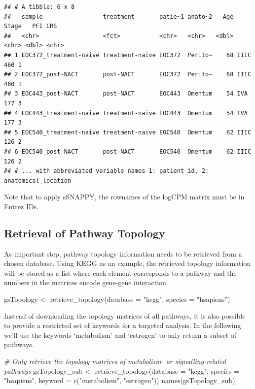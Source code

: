 \documentclass[9pt,a4paper,]{extarticle}
\newenvironment{Shaded}{\begin{snugshade}}{\end{snugshade}}
\newcommand{\AttributeTok}[1]{\textcolor[rgb]{0.77,0.63,0.00}{#1}}
\newcommand{\CommentTok}[1]{\textcolor[rgb]{0.56,0.35,0.01}{\textit{#1}}}
\newcommand{\FunctionTok}[1]{\textcolor[rgb]{0.00,0.00,0.00}{#1}}
\newcommand{\NormalTok}[1]{#1}
\newcommand{\OtherTok}[1]{\textcolor[rgb]{0.56,0.35,0.01}{#1}}
\newcommand{\StringTok}[1]{\textcolor[rgb]{0.31,0.60,0.02}{#1}}
\begin{document}
\begin{verbatim}
## # A tibble: 6 x 8
##   sample                 treatment       patie~1 anato~2   Age Stage   PFI CRS  
##   <chr>                  <fct>           <chr>   <chr>   <dbl> <chr> <dbl> <chr>
## 1 EOC372_treatment-naive treatment-naive EOC372  Perito~    68 IIIC    460 1    
## 2 EOC372_post-NACT       post-NACT       EOC372  Perito~    68 IIIC    460 1    
## 3 EOC443_post-NACT       post-NACT       EOC443  Omentum    54 IVA     177 3    
## 4 EOC443_treatment-naive treatment-naive EOC443  Omentum    54 IVA     177 3    
## 5 EOC540_treatment-naive treatment-naive EOC540  Omentum    62 IIIC    126 2    
## 6 EOC540_post-NACT       post-NACT       EOC540  Omentum    62 IIIC    126 2    
## # ... with abbreviated variable names 1: patient_id, 2: anatomical_location
\end{verbatim}

Note that to apply sSNAPPY, the rownames of the logCPM matrix must be in Entrez IDs.

\hypertarget{retrieval-of-pathway-topology}{%
\subsection{Retrieval of Pathway Topology}\label{retrieval-of-pathway-topology}}

As important step, pathway topology information needs to be retrieved from a chosen database.
Using KEGG as an example, the retrieved topology information will be stored as a list where each element corresponds to a pathway and the numbers in the matrices encode gene-gene interaction.

\begin{Shaded}
\begin{Highlighting}[]
\NormalTok{gsTopology }\OtherTok{\textless{}{-}} \FunctionTok{retrieve\_topology}\NormalTok{(}\AttributeTok{database =} \StringTok{"kegg"}\NormalTok{, }\AttributeTok{species =} \StringTok{"hsapiens"}\NormalTok{)}
\end{Highlighting}
\end{Shaded}

Instead of downloading the topology matrices of all pathways, it is also possible to provide a restricted set of keywords for a targeted analysis.
In the following we'll use the keywords `metabolism' and `estrogen' to only return a subset of pathways.

\begin{Shaded}
\begin{Highlighting}[]
\CommentTok{\# Only retrieve the topology matrices of metabolism{-} or signalling{-}related pathways}
\NormalTok{gsTopology\_sub }\OtherTok{\textless{}{-}} \FunctionTok{retrieve\_topology}\NormalTok{(}\AttributeTok{database =} \StringTok{"kegg"}\NormalTok{, }\AttributeTok{species =} \StringTok{"hsapiens"}\NormalTok{, }
                                    \AttributeTok{keyword =} \FunctionTok{c}\NormalTok{(}\StringTok{"metabolism"}\NormalTok{, }\StringTok{"estrogen"}\NormalTok{))}
\FunctionTok{names}\NormalTok{(gsTopology\_sub)}
\end{Highlighting}
\end{Shaded}
\end{document}
